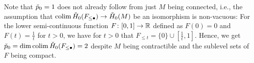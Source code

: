 \begin{rem}
    Note that $\check{p}_0 = 1$ does not already follow from just $M$ being connected, i.e., the assumption that $\operatorname*{colim} \check{H}_0(F_{\leq \bullet}) \to \check{H}_0(M)$ be an isomorphism is non-vacuous:
	For the lower semi-continuous function $F \colon [0,1] \to \mathbb{R}$ defined as $F(0) = 0$ and $F(t) = \frac1t$ for $t > 0$, we have for $t > 0$ that $F_{\leq t} = \{0\} \cup [\frac1t, 1]$.
	Hence, we get $\check{p}_0 = \dim \operatorname*{colim} \check{H}_0(F_{\leq \bullet}) = 2$ despite $M$ being contractible and the sublevel sets of $F$ being compact. %






\end{rem}
